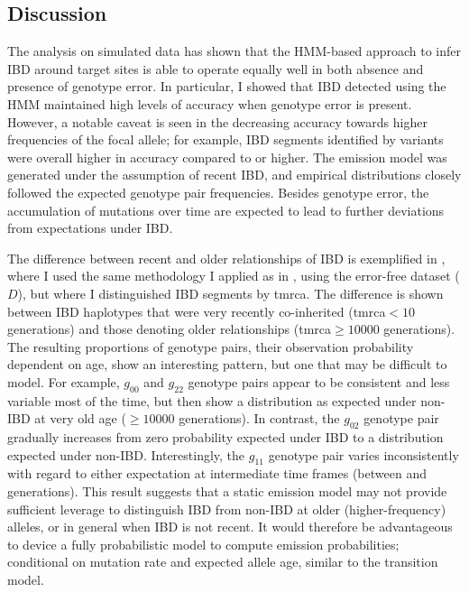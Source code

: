 %

%



%
\subsection{Discussion}
%


%

%


The analysis on simulated data has shown that the HMM-based approach to infer IBD around target sites is able to operate equally well in both absence and presence of genotype error.
In particular, I showed that IBD detected using the HMM maintained high levels of accuracy when genotype error is present.
However, a notable caveat is seen in the decreasing accuracy towards higher frequencies of the focal allele; for example, IBD segments identified by  variants were overall higher in accuracy compared to  or higher.
The emission model was generated under the assumption of recent IBD, and empirical distributions closely followed the expected genotype pair frequencies.
Besides genotype error, the accumulation of mutations over time are expected to lead to further deviations from expectations under IBD.

The difference between recent and older relationships of IBD is exemplified in , where I used the same methodology I applied as in , using the error-free dataset ($D$), but where I distinguished IBD segments by \gls{tmrca}.
The difference is shown between IBD haplotypes that were very recently co-inherited (\gls{tmrca}$<10$ generations) and those denoting older relationships (\gls{tmrca}$\geq \num{10000}$ generations).
The resulting proportions of genotype pairs, \ie their observation probability dependent on age,
show an interesting pattern, but one that may be difficult to model.
For example, $g_{0 0}$ and $g_{2 2}$ genotype pairs appear to be consistent and less variable most of the time, but then show a distribution as expected under non-IBD at very old age ($\geq \num{10000}$ generations).
In contrast, the $g_{0 2}$ genotype pair gradually increases from zero probability expected under IBD to a distribution expected under non-IBD.
Interestingly, the $g_{1 1}$ genotype pair varies inconsistently with regard to either expectation at intermediate time frames (\eg between  and  generations).
This result suggests that a static emission model may not provide sufficient leverage to distinguish IBD from non-IBD at older (\ie higher-frequency) alleles, or in general when IBD is not recent.
It would therefore be advantageous to device a fully probabilistic model to compute emission probabilities; \eg conditional on mutation rate and expected allele age, similar to the transition model.




